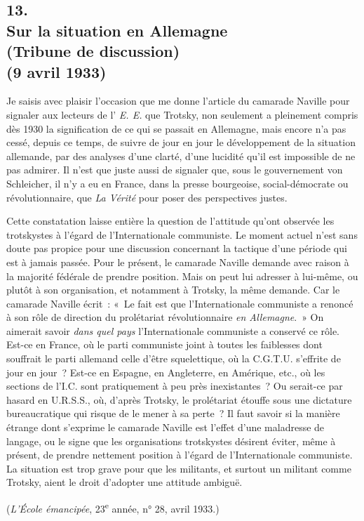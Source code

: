 \documentclass[french,twoside]{book} %
\begin{document}
\subsection[{13. Sur la situation en Allemagne, (Tribune de discussion) (9 avril 1933)}]{13. \\
Sur la situation en Allemagne \\
(Tribune de discussion) \\
(9 avril 1933)}
\noindent \par
Je saisis avec plaisir l'occasion que me donne l'article du camarade Naville pour signaler aux lecteurs de l' {\itshape E. E.} que Trotsky, non seulement a pleinement compris dès 1930 la signification de ce qui se passait en Allemagne, mais encore n'a pas cessé, depuis ce temps, de suivre de jour en jour le dévelop­pement de la situation allemande, par des analyses d'une clarté, d'une lucidité qu'il est impossible de ne pas admirer. Il n'est que juste aussi de signaler que, sous le gouvernement von Schleicher, il n'y a eu en France, dans la presse bourgeoise, social-démocrate ou révolutionnaire, que {\itshape La Vérité} pour poser des perspectives justes.\par
Cette constatation laisse entière la question de l'attitude qu'ont observée les trotskystes à l'égard de l'Internationale communiste. Le moment actuel n'est sans doute pas propice pour une discussion concernant la tactique d'une période qui est à jamais passée. Pour le présent, le camarade Naville demande avec raison à la majorité fédérale de prendre position. Mais on peut lui adresser à lui-même, ou plutôt à son organisation, et notamment à Trotsky, la même demande. Car le camarade Naville écrit : « Le fait est que l'Interna­tionale communiste a renoncé à son rôle de direction du prolétariat révolu­tionnaire {\itshape en Allemagne}. » On aimerait savoir {\itshape dans quel pays} l'Internationale communiste a conservé ce rôle. Est-ce en France, où le parti communiste joint à toutes les faiblesses dont souffrait le parti allemand celle d'être squelettique, où la C.G.T.U. s'effrite de jour en jour ? Est-ce en Espagne, en Angleterre, en Amérique, etc., où les sections de l'I.C. sont pratiquement à peu près inexis­tantes ? Ou serait-ce par hasard en U.R.S.S., où, d'après Trotsky, le prolétariat étouffe sous une dictature bureaucratique qui risque de le mener à sa perte ? Il faut savoir si la manière étrange dont s'exprime le camarade Naville est l'effet d'une maladresse de langage, ou le signe que les organisations trotskystes désirent éviter, même à présent, de prendre nettement position à l'égard de l'Internationale communiste. La situation est trop grave pour que les militants, et surtout un militant comme Trotsky, aient le droit d'adopter une attitude ambiguë.\par
({\itshape L'École émancipée}, 23\textsuperscript{e} année, n° 28, avril 1933.)\par
\end{document}
